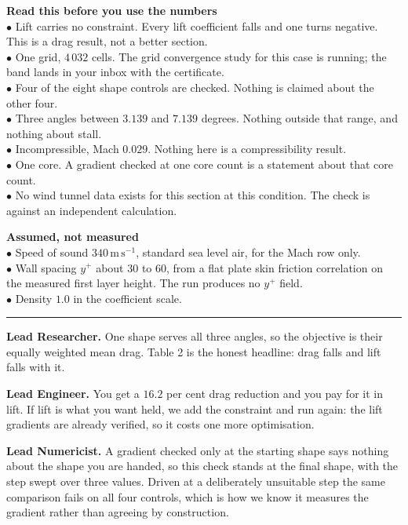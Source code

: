 \documentclass[9pt,a4paper]{article}
\renewcommand{\footnotesize}{\fontsize{6.4}{6.85}\selectfont}
\newcommand{\rolesig}[1]{\textbf{\footnotesize#1}}
\begin{document}
\begin{minipage}[t]{0.285\textwidth}
\colorbox{boxgrey}{\begin{minipage}[t]{0.955\textwidth}
{\footnotesize\textbf{Read this before you use the numbers}\\[1pt]
$\bullet$ Lift carries no constraint. Every lift coefficient falls and one
turns negative. This is a drag result, not a better section.\\
$\bullet$ One grid, $4\,032$ cells. The grid convergence study for this case
is running; the band lands in your inbox with the certificate.\\
$\bullet$ Four of the eight shape controls are checked. Nothing is claimed
about the other four.\\
$\bullet$ Three angles between $3.139$ and $7.139$ degrees. Nothing outside
that range, and nothing about stall.\\
$\bullet$ Incompressible, Mach $0.029$. Nothing here is a compressibility
result.\\
$\bullet$ One core. A gradient checked at one core count is a statement about
that core count.\\
$\bullet$ No wind tunnel data exists for this section at this condition. The
check is against an independent calculation.}
\end{minipage}}

\vspace{3pt}
\colorbox{boxgrey}{\begin{minipage}[t]{0.955\textwidth}
{\footnotesize\textbf{Assumed, not measured}\\[1pt]
$\bullet$ Speed of sound $340\,\mathrm{m\,s^{-1}}$, standard sea level air, for
the Mach row only.\\
$\bullet$ Wall spacing $y^{+}$ about $30$ to $60$, from a flat plate skin
friction correlation on the measured first layer height. The run produces no
$y^{+}$ field.\\
$\bullet$ Density $1.0$ in the coefficient scale.}
\end{minipage}}
\end{minipage}

\vspace{2pt}
{\color{rulegrey}\rule{\textwidth}{0.5pt}}

\vspace{1pt}
{\footnotesize
\rolesig{Lead Researcher.} One shape serves all three angles, so the objective is
their equally weighted mean drag. Table 2 is the honest headline: drag falls and
lift falls with it.

\rolesig{Lead Engineer.} You get a $16.2$ per cent drag reduction and you pay for
it in lift. If lift is what you want held, we add the constraint and run again:
the lift gradients are already verified, so it costs one more optimisation.

\rolesig{Lead Numericist.} A gradient checked only at the starting shape says
nothing about the shape you are handed, so this check stands at the final shape,
with the step swept over three values. Driven at a deliberately unsuitable step
the same comparison fails on all four controls, which is how we know it measures
the gradient rather than agreeing by construction.}
\end{document}
